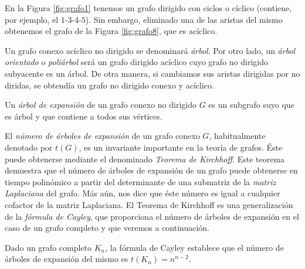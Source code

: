 \begin{exampleth}
En la Figura \ref{fig:grafo1} tenemos un grafo dirigido con ciclos o cíclico (contiene, por ejemplo, el $1$-$3$-$4$-$5$). Sin embargo, eliminado una de las aristas del mismo obtenemos el grafo de la Figura \ref{fig:grafo8}, que es acíclico. 
\end{exampleth}

\begin{definition}
Un grafo conexo acíclico no dirigido se denominará \emph{árbol}. Por otro lado, un \emph{árbol orientado} o \emph{poliárbol} será un grafo dirigido acíclico cuyo grafo no dirigido subyacente es un árbol. De otra manera, si cambiamos sus aristas dirigidas por no diridas, se obtendía un grafo no dirigido conexo y acíclico.
\end{definition}

\begin{definition}
Un \emph{árbol de expansión} de un grafo conexo no dirigido $G$ es un subgrafo suyo que es árbol y que contiene a todos sus vértices.

El \emph{número de árboles de expansión} de un grafo conexo $G$, habitualmente denotado por $t(G)$, es un invariante importante en la teoría de grafos. Éste puede obtenerse mediante el denominado \emph{Teorema de Kirchhoff}. Este teorema demuestra que el número de árboles de expansión de un grafo puede obtenerse en tiempo polinómico a partir del determinante de una submatriz de la \emph{matriz Laplaciana} del grafo. Más aún, nos dice que éste número es igual a cualquier cofactor de la matriz Laplaciana. El Teorema de Kirchhoff es una generalización de la \emph{fórmula de Cayley}, que proporciona el número de árboles de expansión en el caso de un grafo completo y que veremos a continuación.
\end{definition}

\begin{proposition}
Dado un grafo completo $K_n$, la fórmula de Cayley establece que el número de árboles de expansión del mismo es $t(K_n) = n^{n-2}$.
\end{proposition}